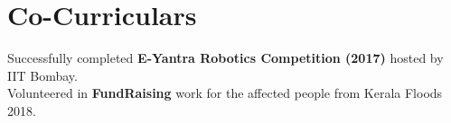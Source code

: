 \documentclass[]{jaydeep-resume-openfont}
\begin{document}
\begin{minipage}[t]{0.29\textwidth}

\section{Co-Curriculars}

\textbullet{} Successfully completed \textbf{E-Yantra Robotics Competition (2017)} hosted by IIT Bombay.\\
\textbullet{} Volunteered in \textbf{FundRaising} work for the affected people from Kerala Floods 2018.
\sectionsep

%
%

\end{minipage}
\hfill
\end{document}
